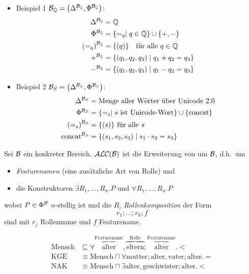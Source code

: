 \begin{tafel}\mbox{}
    \begin{itemize}
        \item Beispiel 1 $\MB_\Q = \left( \Delta^{\MB_\Q}, \Phi^{\MB_\Q} \right)$: 
            \begin{align*}
                \Delta^{\mathcal{B}_{\mathbb{Q}}} &= \mathbb{Q}\\
                \Phi^{\mathcal{B}_{\mathbb{Q}}} &= \{ =_q \mid q \in \mathbb{Q} \} \cup \{+, -\}\\
                {(=_q)}^{\mathcal{B}_{\mathbb{Q}}} &= \{(q)\} \quad \text{für alle } q \in \mathbb{Q}\\
                +^{\mathcal{B}_{\mathbb{Q}}} &= \{(q_1, q_2, q_3) \mid q_1 + q_2 = q_3\}\\
                -^{\mathcal{B}_{\mathbb{Q}}} &= \{(q_1, q_2, q_3) \mid q_1 - q_2 = q_3\}
            \end{align*}
        \item Beispiel 2 $\MB_S = \left( \Delta^{\MB_S}, \Phi^{\MB_S} \right)$: 
            \begin{align*}
                \Delta^{\mathcal{B}_S} &= \text{Menge aller Wörter über Unicode 2.0}\\
                \Phi^{\mathcal{B}_S} &= \{ =_s \mid s\ \text{ist Unicode-Wort}\} \cup \{\text{concat}\}\\
                {(=_s)}^{\mathcal{B}_S} &= \{(s)\}\ \text{für alle}\ s\\
                \text{concat}^{\mathcal{B}_S} &= \{(s_1, s_2, s_3) \mid s_1 \cdot s_2 = s_3\}
            \end{align*}
    \end{itemize}
\end{tafel}


\begin{definition}
    Sei $\mathcal{B}$ ein konkreter Bereich. $\mathcal{A}\mathcal{L}\mathcal{C}(\mathcal{B})$ ist die Erweiterung von \ALC um $\mathcal{B}$, d.h.\ um
    \begin{itemize}
\item \emph{Featurenamen} (eine zusätzliche Art von Rolle) und
\item die Konstruktoren $\exists R_1, \ldots, R_n.P$ und
  $\forall R_1,\ldots,R_n.P$
\end{itemize}
wobei $P \in \Phi^{\mathcal{B}}$ $n$-stellig ist und die $R_i$
\emph{Rollenkomposition} der Form $$r_1;\ldots;r_{k};f$$ sind mit
$r_{j}$ Rollenname und $f$ Featurename.
\end{definition}

\begin{tafel}
    \begin{align*}
        \text{Mensch} &\sqsubseteq \forall \overbrace{\text{alter}}^\text{Featurename},\overbrace{\text{eltern}}^\text{Rolle};\overbrace{\text{alter}}^\text{Featurename}.<\\
        \text{KGE} &\equiv \text{Mensch} \sqcap \forall \text{mutter};\text{alter},\text{vater};\text{alter}.=\\
        \text{NAK} &\equiv \text{Mensch} \sqcap \exists \text{alter}, \text{geschwister};\text{alter}.<
    \end{align*}
\end{tafel}

